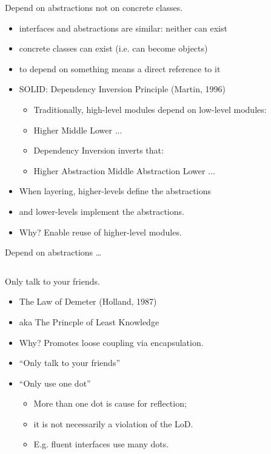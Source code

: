 \documentclass{beamer}
\begin{document}
\begin{frame}{Depend on abstractions not on concrete classes.}
    \begin{itemize}
        \item interfaces and abstractions are similar: neither can exist
        \item concrete classes can exist (i.e. can become objects)
        \item to depend on something means a direct reference to it
        \item SOLID: Dependency Inversion Principle (Martin, 1996)
        \begin{itemize}
            \item Traditionally, high-level modules depend on low-level modules:
            \item Higher \textrightarrow{} Middle \textrightarrow{} Lower \textrightarrow{} ...
            \item Dependency Inversion inverts that:
            \item Higher \textrightarrow{} Abstraction \textleftarrow{} Middle \textrightarrow{} Abstraction \textleftarrow{} Lower ...
        \end{itemize}
        \item When layering, higher-levels define the abstractions
        \item and lower-levels implement the abstractions.
        \item Why? Enable reuse of higher-level modules.
    \end{itemize}
\end{frame}

\begin{frame}{Depend on abstractions \ldots}
    \vspace{0cm}
    \begin{columns}
        \column{\dimexpr\paperwidth-40pt}
        
    \end{columns}
\end{frame}

\begin{frame}{Only talk to your friends.}
    \begin{itemize}
        \item The Law of Demeter (Holland, 1987)
        \item aka The Princple of Least Knowledge
        \item Why? Promotes loose coupling via encapsulation.
        \item ``Only talk to your friends''
        \item ``Only use one dot'' 
            \begin{itemize}
                \item More than one dot is cause for reflection; 
                \item it is not necessarily a violation of the LoD.
                \item E.g. fluent interfaces use many dots.
            \end{itemize}
    \end{itemize}
\end{frame}
\end{document}
